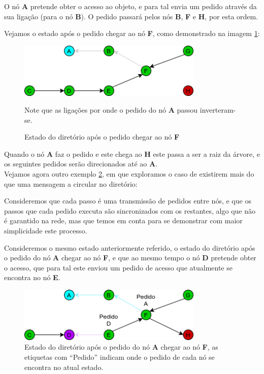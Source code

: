 O nó \textbf{A} pretende obter o acesso ao objeto, e para tal envia um pedido através da sua ligação (para o nó \textbf{B}).
O pedido passará pelos nós \textbf{B}, \textbf{F} e \textbf{H}, por esta ordem.

Vejamos o estado após o pedido chegar ao nó \textbf{F}, como demonstrado na imagem \ref{motivacao:img:apos_chegar_f}:

\begin{figure}[!htb]
\centering
\includegraphics[width=250pt]{um_pedido_2.png}
\caption{Estado do diretório após o pedido chegar ao nó \textbf{F}}
Note que as ligações por onde o pedido do nó \textbf{A} passou inverteram-se.
\label{motivacao:img:apos_chegar_f}
\end{figure}


Quando o nó \textbf{A} faz o pedido e este chega ao \textbf{H} este passa a ser a raiz da árvore, e os seguintes pedidos serão direcionados até ao \textbf{A}.\\



Vejamos agora outro exemplo \ref{motivacao:img:apos_chegar_f_etiquetas}, em que exploramos o caso de existirem mais do que uma mensagem a circular no diretório:

Consideremos que cada passo é uma transmissão de pedidos entre nós, e que os passos que cada pedido executa são sincronizados com os restantes, algo que não é garantido na rede, mas que temos em conta para se demonstrar com maior simplicidade este processo.

Consideremos o mesmo estado anteriormente referido, o estado do diretório após o pedido do nó \textbf{A} chegar ao nó \textbf{F}, e que ao mesmo tempo o nó \textbf{D} pretende obter o acesso, que para tal este enviou um pedido de acesso que atualmente se encontra no nó \textbf{E}.


\begin{figure}[!htb]
\centering
\includegraphics[width=250pt]{dois_pedidos_1.png}
\caption{Estado do diretório após o pedido do nó \textbf{A} chegar ao nó \textbf{F}, as etiquetas com ``Pedido'' indicam onde o pedido de cada nó se encontra no atual estado.}
\label{motivacao:img:apos_chegar_f_etiquetas}
\end{figure}


